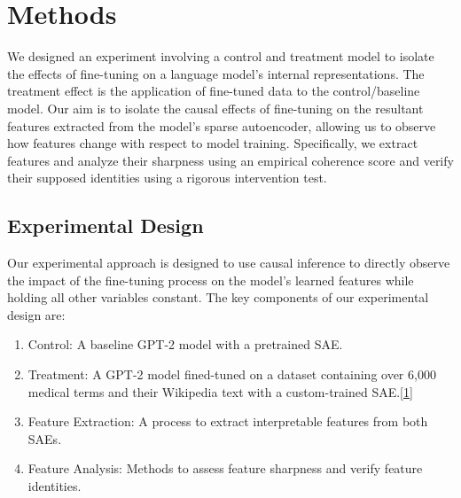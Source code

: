 \section{Methods}



We designed an experiment involving a control and treatment model to isolate the effects of fine-tuning on a language model's internal representations. The treatment effect is the application of fine-tuned data to the control/baseline model. Our aim is to isolate the causal effects of fine-tuning on the resultant features extracted from the model's sparse autoencoder, allowing us to observe how features change with respect to model training. Specifically, we extract features and analyze their sharpness using an empirical coherence score and verify their supposed identities using a rigorous intervention test.

\subsection{Experimental Design}

Our experimental approach is designed to use causal inference to directly observe the impact of the fine-tuning process on the model's learned features while holding all other variables constant. The key components of our experimental design are:

\begin{enumerate}
    \item Control: A baseline GPT-2 model with a pretrained SAE.

    \item Treatment: A GPT-2 model fined-tuned on a dataset containing over 6,000 medical terms and their Wikipedia text with a custom-trained SAE.\hyperlink{med-gpt2}{[1]}

    \item Feature Extraction: A process to extract interpretable features from both SAEs.

    \item Feature Analysis: Methods to assess feature sharpness and verify feature identities.
\end{enumerate}

